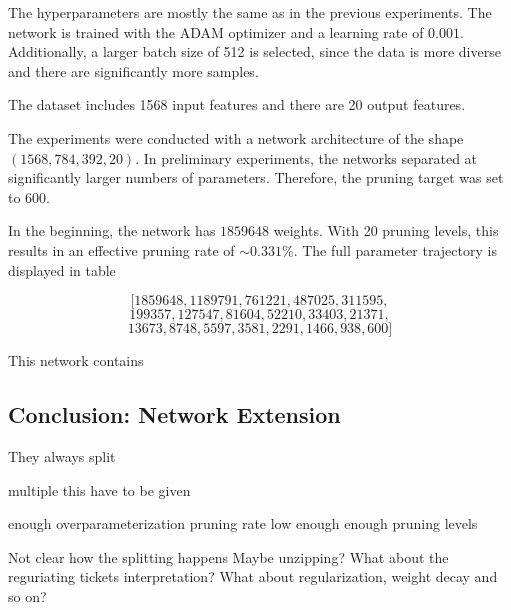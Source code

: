 The hyperparameters are mostly the same as in the previous experiments.
The network is trained with the ADAM optimizer and a learning rate of $0.001$.
Additionally, a larger batch size of 512 is selected, since the data is more diverse and there are significantly more samples.


The dataset includes 1568 input features and there are 20 output features. 

The experiments were conducted with a network architecture of the shape $(1568, 784, 392, 20)$.
In preliminary experiments, the networks separated at significantly larger numbers of parameters.
Therefore, the pruning target was set to 600.





In the beginning, the network has $1859648$ weights.
With 20 pruning levels, this results in an effective pruning rate of $\sim0.331$\%.
The full parameter trajectory is displayed in table

\[
\big[1859648, 1189791, 761221, 487025, 311595, 
\]
\[
199357, 127547, 81604, 52210, 33403,21371,
\]
\[
13673, 8748, 5597, 3581, 2291, 1466, 938, 600\big]    
\]





This network contains

\subsection{Conclusion: Network Extension}
They always split

multiple this have to be given

enough overparameterization
pruning rate low enough
enough pruning levels

Not clear how the splitting happens
Maybe unzipping?
What about the reguriating tickets interpretation?
What about regularization, weight decay and so on?
